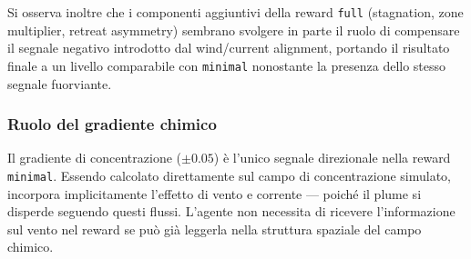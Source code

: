 \documentclass[12pt, a4paper]{article}
\begin{document}
Si osserva inoltre che i componenti aggiuntivi della reward \texttt{full}
(stagnation, zone multiplier, retreat asymmetry) sembrano svolgere in parte il ruolo di
compensare il segnale negativo introdotto dal wind/current alignment, portando il
risultato finale a un livello comparabile con \texttt{minimal} nonostante
la presenza dello stesso segnale fuorviante.

\subsubsection*{Ruolo del gradiente chimico}

Il gradiente di concentrazione ($\pm 0.05$) \`e l'unico segnale direzionale
nella reward \texttt{minimal}. Essendo calcolato direttamente sul campo
di concentrazione simulato, incorpora implicitamente l'effetto di vento e corrente ---
poich\'e il plume si disperde seguendo questi flussi. L'agente non necessita di ricevere
l'informazione sul vento nel reward se pu\`o gi\`a leggerla nella struttura spaziale
del campo chimico.
\end{document}
